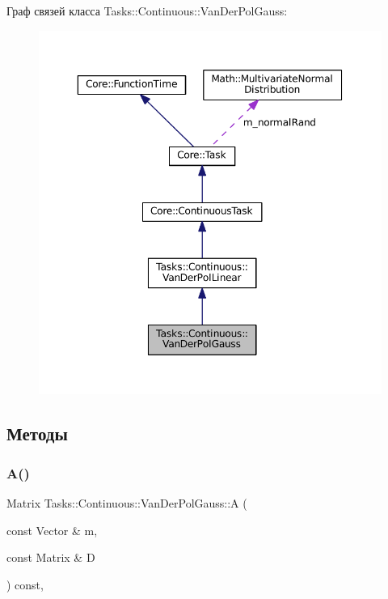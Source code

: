 Граф связей класса Tasks\+:\+:Continuous\+:\+:Van\+Der\+Pol\+Gauss\+:
\nopagebreak
\begin{figure}[H]
\begin{center}
\leavevmode
\includegraphics[width=350pt]{class_tasks_1_1_continuous_1_1_van_der_pol_gauss__coll__graph}
\end{center}
\end{figure}


\subsection{Методы}
\hypertarget{class_tasks_1_1_continuous_1_1_van_der_pol_gauss_a2ef625f7f8c590726c5b52e67622c172}{}\label{class_tasks_1_1_continuous_1_1_van_der_pol_gauss_a2ef625f7f8c590726c5b52e67622c172} 
\subsubsection{\texorpdfstring{A()}{A()}}
{\footnotesize\ttfamily Matrix Tasks\+::\+Continuous\+::\+Van\+Der\+Pol\+Gauss\+::A (\begin{DoxyParamCaption}\item[{const Vector \&}]{m,  }\item[{const Matrix \&}]{D }\end{DoxyParamCaption}) const\hspace{0.3cm}{\ttfamily [override]}, {\ttfamily [virtual]}}




